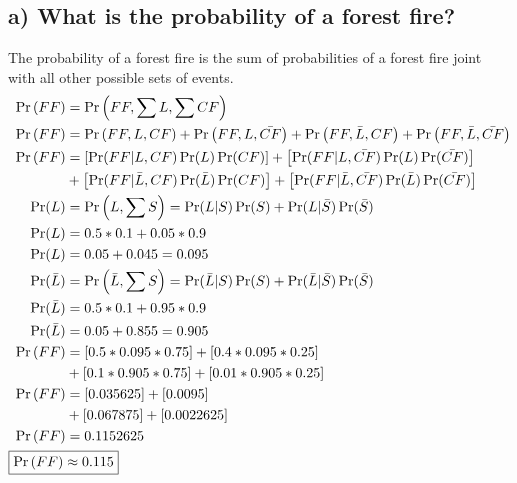 \documentclass[12pt,letterpaper]{article}
\begin{document}
\subsection{a) What is the probability of a forest fire?}
The probability of a forest fire is the sum of probabilities of a forest fire joint with all other possible sets of events.
\begin{align*}
\Pr\left(FF\right) &= \Pr\left(FF,\sum{L},\sum{CF}\right)\\
\Pr\left(FF\right) &= \Pr\left(FF,L,CF\right) + \Pr\left(FF,L,\bar{CF}\right) + \Pr\left(FF,\bar{L},CF\right) + \Pr\left(FF,\bar{L},\bar{CF}\right)\\
\Pr\left(FF\right) &= \left[\Pr(FF|L,CF)\Pr(L)\Pr(CF)\right] + \left[\Pr(FF|L,\bar{CF})\Pr(L)\Pr(\bar{CF})\right]\\
&+\left[\Pr(FF|\bar{L},CF)\Pr(\bar{L})\Pr(CF)\right] + \left[\Pr(FF|\bar{L},\bar{CF})\Pr(\bar{L})\Pr(\bar{CF})\right]\\
\Pr(L) &= \Pr\left(L,\sum{S}\right) = \Pr(L|S)\Pr(S) + \Pr(L|\bar{S})\Pr(\bar{S})\\
\Pr(L) &= 0.5*0.1 + 0.05*0.9\\
\Pr(L) &= 0.05+0.045=0.095\\
\Pr(\bar{L}) &= \Pr\left(\bar{L},\sum{S}\right) = \Pr(\bar{L}|S)\Pr(S) + \Pr(\bar{L}|\bar{S})\Pr(\bar{S})\\
\Pr(\bar{L}) &= 0.5*0.1 + 0.95*0.9\\
\Pr(\bar{L}) &= 0.05+0.855 = 0.905\\
\Pr\left(FF\right) &= \left[0.5*0.095*0.75\right] + \left[0.4*0.095*0.25\right]\\
&+\left[0.1*0.905*0.75\right] + \left[0.01*0.905*0.25\right]\\
\Pr\left(FF\right) &= \left[0.035625\right] + \left[0.0095\right]\\
&+\left[0.067875\right] + \left[0.0022625\right]\\
\Pr\left(FF\right) &= 0.1152625\\
\Aboxed{\Pr\left(FF\right) &\approx 0.115}
\end{align*}
\end{document}
